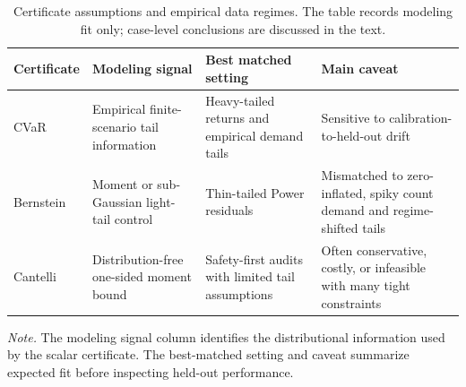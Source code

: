 \begin{table}[t]
\centering
\small
\caption{Certificate assumptions and empirical data regimes. The table records modeling fit only; case-level conclusions are discussed in the text.}
\label{tab:certificate_fit}
\begin{tabularx}{\linewidth}{lYYY}
\toprule
Certificate & Modeling signal & Best matched setting & Main caveat \\
\midrule
CVaR & Empirical finite-scenario tail information & Heavy-tailed returns and empirical demand tails & Sensitive to calibration-to-held-out drift \\
Bernstein & Moment or sub-Gaussian light-tail control & Thin-tailed Power residuals & Mismatched to zero-inflated, spiky count demand and regime-shifted tails \\
Cantelli & Distribution-free one-sided moment bound & Safety-first audits with limited tail assumptions & Often conservative, costly, or infeasible with many tight constraints \\
\bottomrule
\end{tabularx}
\vspace{2pt}
\begin{minipage}{.98\linewidth}
\footnotesize \textit{Note.} The modeling signal column identifies the distributional information used by the scalar certificate. The best-matched setting and caveat summarize expected fit before inspecting held-out performance.
\end{minipage}
\end{table}
